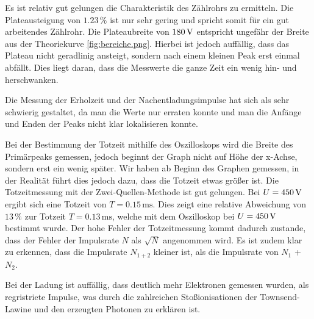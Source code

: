 Es ist relativ gut gelungen die Charakteristik des Zählrohrs zu ermitteln.
Die Plateausteigung von $1.23\,\%$ ist nur sehr gering und spricht somit für
ein gut arbeitendes Zählrohr. Die Plateaubreite von $180\,\si{\volt}$ entspricht
ungefähr der Breite aus der Theoriekurve \ref{fig:bereiche.png}. Hierbei
ist jedoch auffällig, dass das Plateau nicht geradlinig ansteigt, sondern
nach einem kleinen Peak erst einmal abfällt. Dies liegt daran, dass die
Messwerte die ganze Zeit ein wenig hin- und herschwanken.

Die Messung der Erholzeit und der Nachentladungsimpulse hat sich als sehr
schwierig gestaltet, da man die Werte nur erraten konnte und man die
Anfänge und Enden der Peaks nicht klar lokalisieren konnte.

Bei der Bestimmung der Totzeit mithilfe des Oszilloskops wird die Breite des Primärpeaks gemessen, jedoch beginnt der Graph nicht auf Höhe der x-Achse, sondern erst ein wenig
später. Wir haben ab Beginn des Graphen gemessen, in der Realität führt
dies jedoch dazu, dass die Totzeit etwas größer ist.
Die Totzeitmessung mit der Zwei-Quellen-Methode ist gut gelungen. Bei
$U=450\,\si{\volt}$ ergibt sich eine Totzeit von $T=0.15\,\si{\milli\second}$.
Dies zeigt eine relative Abweichung von $13\,\%$ zur Totzeit $T=0.13\,\si{\milli\second}$, welche mit
dem Oszilloskop bei $U=450\,\si{\volt}$ bestimmt wurde. Der hohe Fehler der
Totzeitmessung kommt dadurch zustande, dass der Fehler der Impulsrate $N$
als $\sqrt{N}$ angenommen wird.
Es ist zudem klar zu erkennen, dass die Impulsrate $N_{1+2}$ kleiner ist, als die Impulsrate von $N_1$ + $N_2$.

Bei der Ladung ist auffällig, dass deutlich mehr Elektronen gemessen wurden,
als regristriete Impulse, was durch die zahlreichen Stoßionisationen
der Townsend-Lawine und den erzeugten Photonen zu erklären ist.
